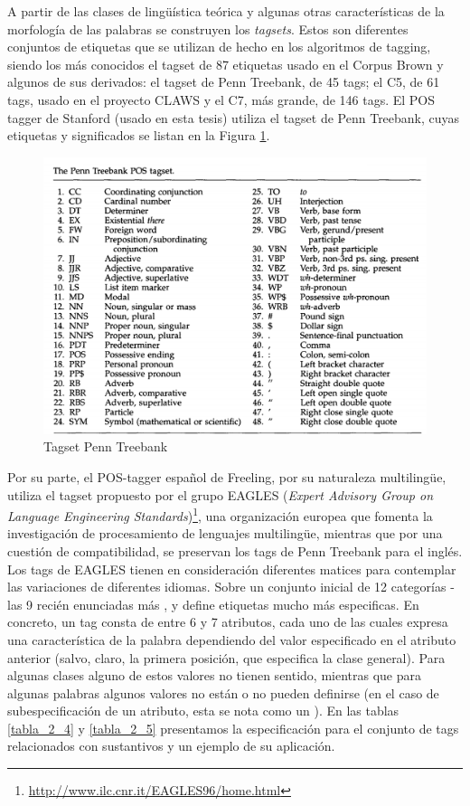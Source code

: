 A partir de las clases de lingüística teórica y algunas otras características de la morfología de las palabras se construyen los \textit{tagsets}. Estos son diferentes conjuntos de etiquetas que se utilizan de hecho en los algoritmos de tagging, siendo los más conocidos el tagset de 87 etiquetas usado en el Corpus Brown y algunos de sus derivados: el tagset de Penn Treebank, de 45 tags; el C5, de 61 tags, usado en el proyecto CLAWS y el C7, más grande, de 146 tags.
El POS tagger de Stanford\cite{POS2} (usado en esta tesis) utiliza el tagset de Penn Treebank, cuyas etiquetas y significados se listan en la Figura \ref{fig:tagset-penn}.

\begin{figure}[H]
  \centering
    \includegraphics[scale=0.3]{graficos/penn-tagset}
  \caption{Tagset Penn Treebank}
  \label{fig:tagset-penn}
\end{figure}

Por su parte, el POS-tagger español de Freeling, por su naturaleza multilingüe, utiliza el tagset propuesto por el grupo EAGLES (\textit{Expert Advisory Group on Language Engineering Standards})\footnote{\url{http://www.ilc.cnr.it/EAGLES96/home.html}}, una organización europea que fomenta la investigación de procesamiento de lenguajes multilingüe, mientras que por una cuestión de compatibilidad, se preservan los tags de Penn Treebank para el inglés. Los tags de EAGLES tienen en consideración diferentes matices para contemplar las variaciones de diferentes idiomas. Sobre un conjunto inicial de 12 categorías -las 9 recién enunciadas más ,  y  define etiquetas mucho más especificas. En concreto, un tag consta de entre 6 y 7 atributos, cada uno de las cuales expresa una característica de la palabra dependiendo del valor especificado en el atributo anterior (salvo, claro, la primera posición, que especifica la clase general). Para algunas clases alguno de estos valores no tienen sentido, mientras que para algunas palabras algunos valores no están o no pueden definirse (en el caso de subespecificación de un atributo, esta se nota como un ).
En las tablas \ref{tabla_2_4} y \ref{tabla_2_5} presentamos la especificación para el conjunto de tags relacionados con sustantivos y un ejemplo de su aplicación.


